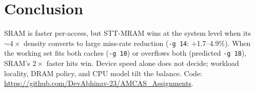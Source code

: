 \documentclass[a4paper,11pt]{article}
\begin{document}
\section*{Conclusion}

SRAM is faster per-access, but STT-MRAM wins at the system level when its ${\sim}4\times$ density converts to large miss-rate reduction (\texttt{-g\,14}: +1.7--4.9\%). When the working set fits both caches (\texttt{-g\,10}) or overflows both (predicted \texttt{-g\,18}), SRAM's $2\times$ faster hits win. Device speed alone does not decide; workload locality, DRAM policy, and CPU model tilt the balance. Code: \url{https://github.com/DevAbhinav-23/AMCAS_Assignments}.
\end{document}
